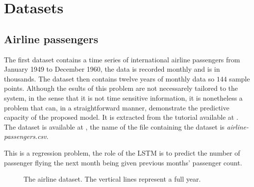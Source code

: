\section{Datasets}

\subsection{Airline passengers}

The first dataset contains a time series of international airline passengers from January 1949 to December 1960, the data is recorded monthly and is in thousands. The dataset then contains twelve years of monthly data so $144$ sample points. Although the esults of this problem are not necessarely tailored to the system, in the sense that it is not time sensitive information, it is nonetheless a problem that can, in a straightforward manner, demonstrate the predictive capacity of the proposed model. It is extracted from the tutorial available at \cite{airline}. The dataset is available at \cite{datasets}, the name of the file containing the dataset is \textit{airline-passengers.csv}.

This is a regression problem, the role of the \ac{LSTM} is to predict the number of passenger flying the next month being given previous months' passenger count.

\begin{figure}[H]
\centering

\caption{The airline dataset. The vertical lines represent a full year.}
\label{graph:airline}
\end{figure}

